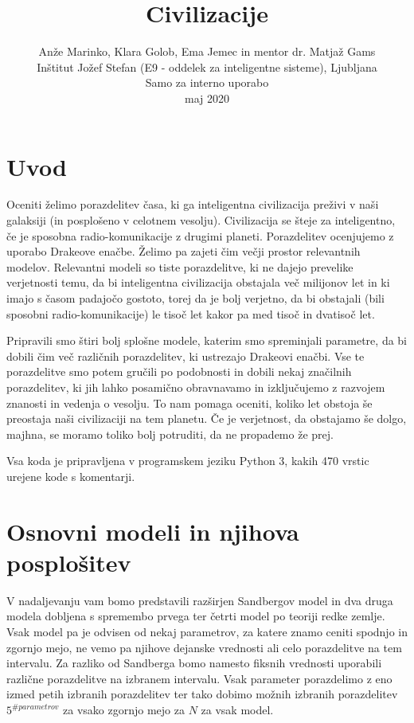 \documentclass[a4paper]{IEEEtran}
\title{Civilizacije}
\author{Anže Marinko, Klara Golob, Ema Jemec in mentor dr. Matjaž Gams \\ Inštitut Jožef Stefan (E9 - oddelek za inteligentne sisteme), Ljubljana \\ Samo za interno uporabo \\ maj 2020}
\begin{document}
\maketitle
\tableofcontents

\section{Uvod}

Oceniti želimo porazdelitev časa, ki ga inteligentna civilizacija preživi v naši galaksiji (in posplošeno v celotnem vesolju). Civilizacija se šteje za inteligentno, če je sposobna radio-komunikacije z drugimi planeti. Porazdelitev ocenjujemo z uporabo Drakeove enačbe. Želimo pa zajeti čim večji prostor relevantnih modelov. Relevantni modeli so tiste porazdelitve, ki ne dajejo prevelike verjetnosti temu, da bi inteligentna civilizacija obstajala več milijonov let in ki imajo s časom padajočo gostoto, torej da je bolj verjetno, da bi obstajali (bili sposobni radio-komunikacije) le tisoč let kakor pa med tisoč in dvatisoč let.

Pripravili smo štiri bolj splošne modele, katerim smo spreminjali parametre, da bi dobili čim več različnih porazdelitev, ki ustrezajo Drakeovi enačbi. Vse te porazdelitve smo potem gručili po podobnosti in dobili nekaj značilnih porazdelitev, ki jih lahko posamično obravnavamo in izključujemo z razvojem znanosti in vedenja o vesolju. To nam pomaga oceniti, koliko let obstoja še preostaja naši civilizaciji na tem planetu. Če je verjetnost, da obstajamo še dolgo, majhna, se moramo toliko bolj potruditi, da ne propademo že prej.

Vsa koda je pripravljena v programskem jeziku Python 3, kakih 470 vrstic urejene kode s komentarji.

\section{Osnovni modeli in njihova posplošitev}

V nadaljevanju vam bomo predstavili razširjen Sandbergov model in dva druga modela dobljena s spremembo prvega ter četrti model po teoriji redke zemlje. Vsak model pa je odvisen od nekaj parametrov, za katere znamo ceniti spodnjo in zgornjo mejo, ne vemo pa njihove dejanske vrednosti ali celo porazdelitve na tem intervalu. Za razliko od Sandberga bomo namesto fiksnih vrednosti uporabili različne porazdelitve na izbranem intervalu. Vsak parameter porazdelimo z eno izmed petih izbranih porazdelitev ter tako dobimo možnih izbranih porazdelitev $5^{\#parametrov}$ za vsako zgornjo mejo za $N$ za vsak model.
\end{document}
